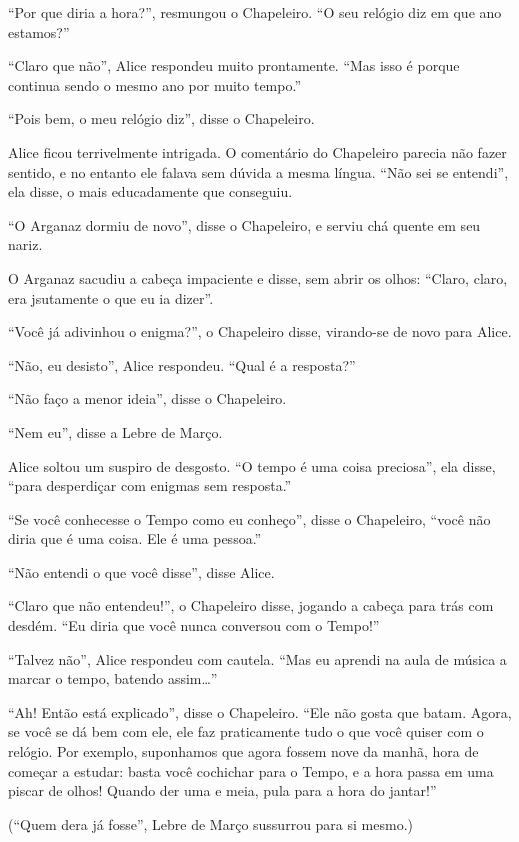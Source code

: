 ``Por que diria a hora?'', resmungou o Chapeleiro. ``O seu relógio diz
em que ano estamos?''

``Claro que não'', Alice respondeu muito prontamente. ``Mas isso é
porque continua sendo o mesmo ano por muito tempo.''

``Pois bem, o meu relógio diz'', disse o Chapeleiro.

Alice ficou terrivelmente intrigada. O comentário do Chapeleiro parecia
não fazer sentido, e no entanto ele falava sem dúvida a mesma língua.
``Não sei se entendi'', ela disse, o mais educadamente que conseguiu.

``O Arganaz dormiu de novo'', disse o Chapeleiro, e serviu chá quente em
seu nariz.

O Arganaz sacudiu a cabeça impaciente e disse, sem abrir os olhos:
``Claro, claro, era jsutamente o que eu ia dizer''.

``Você já adivinhou o enigma?'', o Chapeleiro disse, virando-se de novo
para Alice.

``Não, eu desisto'', Alice respondeu. ``Qual é a resposta?''

``Não faço a menor ideia'', disse o Chapeleiro.

``Nem eu'', disse a Lebre de Março.

Alice soltou um suspiro de desgosto. ``O tempo é uma coisa preciosa'',
ela disse, ``para desperdiçar com enigmas sem resposta.''

``Se você conhecesse o Tempo como eu conheço'', disse o Chapeleiro,
``você não diria que é uma coisa. Ele é uma pessoa.''

``Não entendi o que você disse'', disse Alice.

``Claro que não entendeu!'', o Chapeleiro disse, jogando a cabeça para
trás com desdém. ``Eu diria que você nunca conversou com o Tempo!''

``Talvez não'', Alice respondeu com cautela. ``Mas eu aprendi na aula de
música a marcar o tempo, batendo assim\ldots{}''

``Ah! Então está explicado'', disse o Chapeleiro. ``Ele não gosta que
batam. Agora, se você se dá bem com ele, ele faz praticamente tudo o que
você quiser com o relógio. Por exemplo, suponhamos que agora fossem nove
da manhã, hora de começar a estudar: basta você cochichar para o Tempo,
e a hora passa em uma piscar de olhos! Quando der uma e meia, pula para
a hora do jantar!''

(``Quem dera já fosse'', Lebre de Março sussurrou para si mesmo.)

